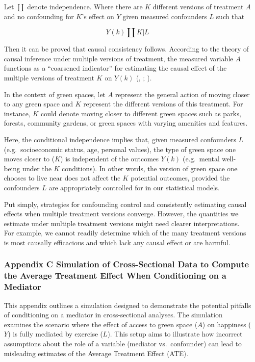 \documentclass[
  singlecolumn]{article}
\begin{document}
Let \(\coprod\) denote independence. Where there are \(K\) different
versions of treatment \(A\) and no confounding for \(K\)'s effect on
\(Y\) given measured confounders \(L\) such that

\[
Y(k) \coprod K | L
\]

Then it can be proved that causal consistency follows. According to the
theory of causal inference under multiple versions of treatment, the
measured variable \(A\) functions as a ``coarsened indicator'' for
estimating the causal effect of the multiple versions of treatment \(K\)
on \(Y(k)\) (,
;
).

In the context of green spaces, let \(A\) represent the general action
of moving closer to any green space and \(K\) represent the different
versions of this treatment. For instance, \(K\) could denote moving
closer to different green spaces such as parks, forests, community
gardens, or green spaces with varying amenities and features.

Here, the conditional independence implies that, given measured
confounders \(L\) (e.g.~socioeconomic status, age, personal values), the
type of green space one moves closer to (\(K\)) is independent of the
outcomes \(Y(k)\) (e.g.~mental well-being under the \(K\) conditions).
In other words, the version of green space one chooses to live near does
not affect the \(K\) potential outcomes, provided the confounders \(L\)
are appropriately controlled for in our statistical models.

Put simply, strategies for confounding control and consistently
estimating causal effects when multiple treatment versions converge.
However, the quantities we estimate under multiple treatment versions
might need clearer interpretations. For example, we cannot readily
determine which of the many treatment versions is most causally
efficacious and which lack any causal effect or are harmful.

\newpage{}

\subsubsection{Appendix C Simulation of Cross-Sectional Data to Compute
the Average Treatment Effect When Conditioning on a
Mediator}\label{appendix-c}

This appendix outlines a simulation designed to demonstrate the
potential pitfalls of conditioning on a mediator in cross-sectional
analyses. The simulation examines the scenario where the effect of
access to green space (\(A\)) on happiness (\(Y\)) is fully mediated by
exercise (\(L\)). This setup aims to illustrate how incorrect
assumptions about the role of a variable (mediator vs.~confounder) can
lead to misleading estimates of the Average Treatment Effect (ATE).
\end{document}
